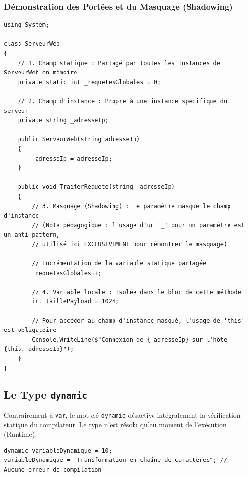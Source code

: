 \subsubsection{Démonstration des Portées et du Masquage (Shadowing)}

\begin{lstlisting}[caption={Gestion de la portée, variables statiques et masquage}]
using System;

class ServeurWeb
{
    // 1. Champ statique : Partagé par toutes les instances de ServeurWeb en mémoire
    private static int _requetesGlobales = 0;

    // 2. Champ d'instance : Propre à une instance spécifique du serveur
    private string _adresseIp;

    public ServeurWeb(string adresseIp)
    {
        _adresseIp = adresseIp;
    }

    public void TraiterRequete(string _adresseIp)
    {
        // 3. Masquage (Shadowing) : Le paramètre masque le champ d'instance
        // (Note pédagogique : l'usage d'un '_' pour un paramètre est un anti-pattern,
        // utilisé ici EXCLUSIVEMENT pour démontrer le masquage).
        
        // Incrémentation de la variable statique partagée
        _requetesGlobales++; 
        
        // 4. Variable locale : Isolée dans le bloc de cette méthode
        int taillePayload = 1024;
        
        // Pour accéder au champ d'instance masqué, l'usage de 'this' est obligatoire
        Console.WriteLine($"Connexion de {_adresseIp} sur l'hôte {this._adresseIp}");
    }
}
\end{lstlisting}

\subsection{Le Type \texttt{dynamic}}

Contrairement à \texttt{var}, le mot-clé \texttt{dynamic} désactive intégralement la vérification statique du compilateur. Le type n'est résolu qu'au moment de l'exécution (Runtime).

\begin{lstlisting}[caption={Désactivation du typage avec dynamic}]
dynamic variableDynamique = 10;
variableDynamique = "Transformation en chaîne de caractères"; // Aucune erreur de compilation
\end{lstlisting}

